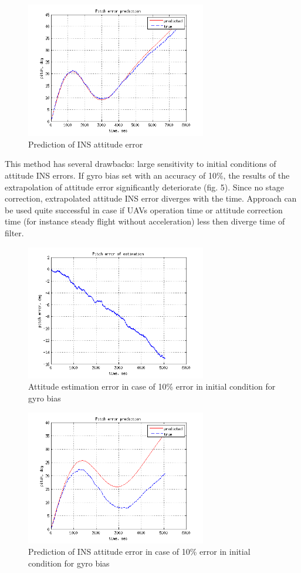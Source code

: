 \documentclass[conference, utf8]{IEEEtran}
\begin{document}
\begin{figure}[!t]
  \centering
  \includegraphics[width=3.1in]{theta_err}
  \caption{Prediction of  INS attitude error}
  \label{fig:theta_err}
\end{figure}

This method has several drawbacks: large sensitivity to initial conditions 
of attitude INS errors. If gyro bias set with an accuracy of 10\%, the results 
of the extrapolation of attitude error significantly deteriorate (fig. 5). 
Since no stage correction, extrapolated attitude INS error diverges with the 
time. Approach can be used quite successful in case if UAVs operation time 
or attitude correction time (for instance steady flight without acceleration) 
less then diverge time of filter.
\begin{figure}[!t]
  \centering
  \includegraphics[width=3.1in]{theta_err_of_err_2}
  \caption{Attitude estimation error in case of 10\% error in initial condition for gyro bias}
  \label{fig:theta_err_err2}
\end{figure}

\begin{figure}[!t]
  \centering
  \includegraphics[width=3.1in]{theta_err_2}
  \caption{Prediction of  INS attitude error in case of 10\% error in initial condition for gyro bias}
  \label{fig:theta_err2}
\end{figure}
\end{document}
